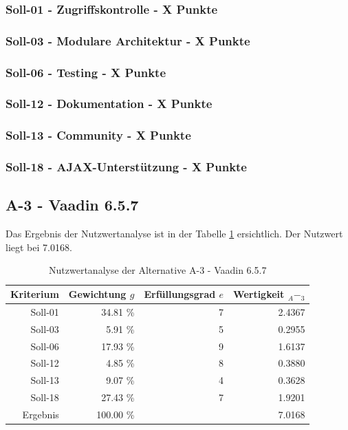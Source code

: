   \subsubsection{Soll-01 - Zugriffskontrolle - X Punkte}
  
  \subsubsection{Soll-03 - Modulare Architektur - X Punkte}
  
  \subsubsection{Soll-06 - Testing - X Punkte}
  
  \subsubsection{Soll-12 - Dokumentation - X Punkte}
  
  \subsubsection{Soll-13 - Community - X Punkte}

  \subsubsection{Soll-18 - AJAX-Unterstützung - X Punkte}
  
  \subsection{A-3 - Vaadin 6.5.7}
  
  Das Ergebnis der Nutzwertanalyse ist in der Tabelle \ref{tab:nwaA3}
  ersichtlich. Der Nutzwert liegt bei 7.0168.
    
  \begin{table}[ht]
    \sffamily 
    \begin{center}
      \begin{tabular}{r|rrr}
        \toprule
        \textbf{Kriterium} & \textbf{Gewichtung \(g\)} & \textbf{Erfüllungsgrad
        \(e\)} & \textbf{Wertigkeit \(_A-_3\)} \\
        \midrule
        Soll-01   & 34.81 \% & 7 & 2.4367 \\
        Soll-03   &  5.91 \% & 5 & 0.2955 \\
        Soll-06   & 17.93 \% & 9 & 1.6137 \\
        Soll-12   &  4.85 \% & 8 & 0.3880 \\
        Soll-13   &  9.07 \% & 4 & 0.3628 \\
        Soll-18   & 27.43 \% & 7 & 1.9201 \\
        \midrule
        \midrule
        Ergebnis  & 100.00 \% &   & 7.0168 \\
        \bottomrule
      \end{tabular}
      \caption{Nutzwertanalyse der Alternative A-3 - Vaadin 6.5.7}
      \label{tab:nwaA3}
    \end{center}
  \end{table}
  

